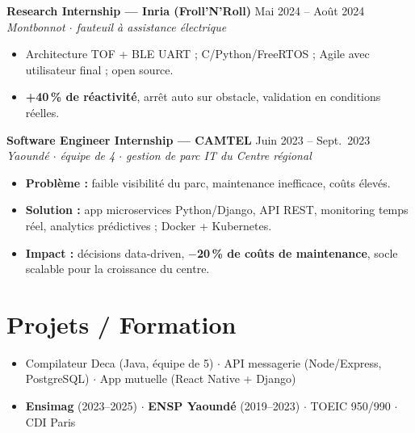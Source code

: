 \documentclass[10pt,a4paper]{article}
\begin{document}
\textbf{Research Internship --- Inria (Froll'N'Roll)} \hfill Mai 2024 -- Août 2024\\
{\small\textit{Montbonnot $\cdot$ fauteuil à assistance électrique}}
\begin{itemize}
  \item Architecture TOF + BLE UART ; C/Python/FreeRTOS ; Agile avec utilisateur final ; open source.
  \item \textbf{+40\,\% de réactivité}, arrêt auto sur obstacle, validation en conditions réelles.
\end{itemize}

\textbf{Software Engineer Internship --- CAMTEL} \hfill Juin 2023 -- Sept.\ 2023\\
{\small\textit{Yaoundé $\cdot$ équipe de 4 $\cdot$ gestion de parc IT du Centre régional}}
\begin{itemize}
  \item \textbf{Problème :} faible visibilité du parc, maintenance inefficace, coûts élevés.
  \item \textbf{Solution :} app microservices Python/Django, API REST, monitoring temps réel, analytics prédictives ; Docker + Kubernetes.
  \item \textbf{Impact :} décisions data-driven, \textbf{$-$20\,\% de coûts de maintenance}, socle scalable pour la croissance du centre.
\end{itemize}

\section*{Projets / Formation}
\begin{itemize}
  \item Compilateur Deca (Java, équipe de 5) $\cdot$ API messagerie (Node/Express, PostgreSQL) $\cdot$ App mutuelle (React Native + Django)
  \item \textbf{Ensimag} (2023--2025) $\cdot$ \textbf{ENSP Yaoundé} (2019--2023) $\cdot$ TOEIC 950/990 $\cdot$ CDI Paris
\end{itemize}
\end{document}

